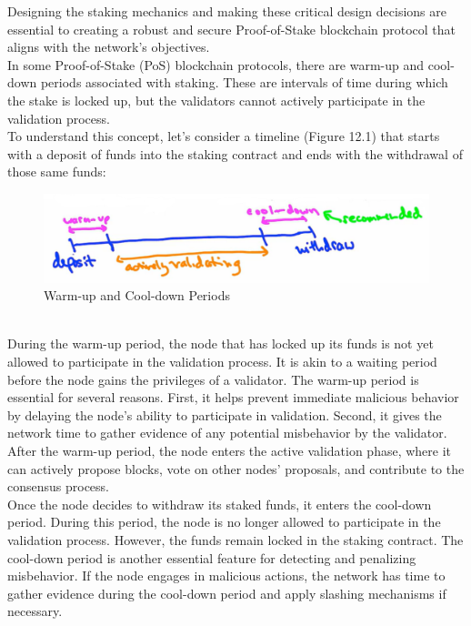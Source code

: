 Designing the staking mechanics and making these critical design decisions are essential to creating a robust and secure Proof-of-Stake blockchain protocol that aligns with the network's objectives.\\
In some Proof-of-Stake (PoS) blockchain protocols, there are warm-up and cool-down periods associated with staking. These are intervals of time during which the stake is locked up, but the validators cannot actively participate in the validation process.\\
To understand this concept, let's consider a timeline (Figure 12.1) that starts with a deposit of funds into the staking contract and ends with the withdrawal of those same funds:
\begin{figure}[h]
    \centering
    \includegraphics[scale = 0.5]{figures/f50.png}
    \caption{Warm-up and Cool-down Periods}
    \label{fig:mesh1}
\end{figure}\\

During the warm-up period, the node that has locked up its funds is not yet allowed to participate in the validation process. It is akin to a waiting period before the node gains the privileges of a validator. The warm-up period is essential for several reasons. First, it helps prevent immediate malicious behavior by delaying the node's ability to participate in validation. Second, it gives the network time to gather evidence of any potential misbehavior by the validator.\\
After the warm-up period, the node enters the active validation phase, where it can actively propose blocks, vote on other nodes' proposals, and contribute to the consensus process.\\
Once the node decides to withdraw its staked funds, it enters the cool-down period. During this period, the node is no longer allowed to participate in the validation process. However, the funds remain locked in the staking contract. The cool-down period is another essential feature for detecting and penalizing misbehavior. If the node engages in malicious actions, the network has time to gather evidence during the cool-down period and apply slashing mechanisms if necessary.

